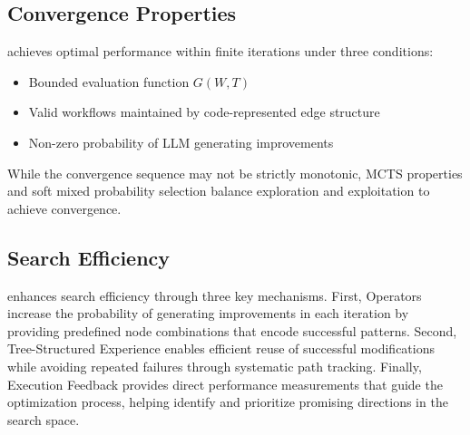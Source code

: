 \subsection{Convergence Properties}
\model achieves optimal performance within finite iterations under three conditions:
\begin{itemize}[leftmargin=20pt]
\item Bounded evaluation function $G(W,T)$
\item Valid workflows maintained by code-represented edge structure
\item Non-zero probability of LLM generating improvements
\end{itemize}
While the convergence sequence may not be strictly monotonic, MCTS properties and soft mixed probability selection balance exploration and exploitation to achieve convergence.

\subsection{Search Efficiency}

\model enhances search efficiency through three key mechanisms. First, Operators increase the probability of generating improvements in each iteration by providing predefined node combinations that encode successful patterns. Second, Tree-Structured Experience enables efficient reuse of successful modifications while avoiding repeated failures through systematic path tracking. Finally, Execution Feedback provides direct performance measurements that guide the optimization process, helping \model identify and prioritize promising directions in the search space.

